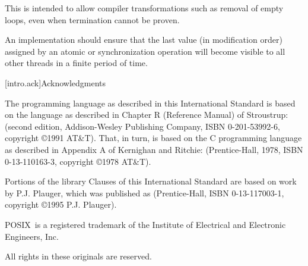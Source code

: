 \begin{note} This is intended to allow compiler transformations such as removal of
empty loops, even when termination cannot be proven. \end{note}

\pnum
An implementation should ensure that the last value (in modification order)
assigned by an atomic or synchronization operation will become visible to all
other threads in a finite period of time.%
%

[intro.ack]{Acknowledgments}

\pnum
The \Cpp  programming language as described in this International
Standard is based on the language as described in Chapter R (Reference
Manual) of Stroustrup:  (second
edition, Addison-Wesley Publishing Company, ISBN 0-201-53992-6,
copyright \copyright 1991 AT\&T). That, in turn, is based on the C
programming language as described in Appendix A of Kernighan and
Ritchie:  (Prentice-Hall, 1978, ISBN
0-13-110163-3, copyright \copyright 1978 AT\&T).

\pnum
Portions of the library Clauses of this International Standard are based
on work by P.J. Plauger, which was published as  (Prentice-Hall, ISBN 0-13-117003-1, copyright
\copyright 1995 P.J. Plauger).

\pnum
POSIX\textregistered\ is a registered trademark of the Institute of Electrical and
Electronic Engineers, Inc.

\pnum
All rights in these originals are reserved.
